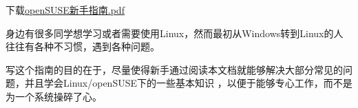 下载\href{http://home.ustc.edu.cn/~zpj/pdf/openSUSE\%e6\%96\%b0\%e6\%89\%8b\%e6\%8c\%87\%e5\%8d\%97.pdf}{openSUSE新手指南.pdf}

身边有很多同学想学习或者需要使用Linux，然而最初从Windows转到Linux的人往往有各种不习惯，遇到各种问题。

写这个指南的目的在于，尽量使得新手通过阅读本文档就能够解决大部分常见的问题，并且学会Linux/openSUSE下的一些基本知识
，以便于能够专心工作，而不是为一个系统操碎了心。
